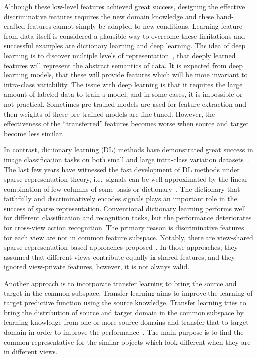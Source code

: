 Although these low-level features achieved great success, designing the effective discriminative features requires the new domain knowledge and these hand-crafted features cannot simply be adapted to new conditions. Learning feature from data itself is considered a plausible way to overcome these limitations and successful examples are dictionary learning and deep learning.
The idea of deep learning is to discover multiple levels of representation~\cite{deng2014deep}, that deeply learned features will represent the abstract semantics of data. It is expected from deep learning models, that these will provide features which will be more invariant to intra-class variability. The issue with deep learning is that it requires the large amount of labeled data to train a model, and in some cases, it is impossible or not practical. Sometimes pre-trained models are used for feature extraction and then weights of these pre-trained models are fine-tuned. However, the effectiveness of the \enquote{transferred} features becomes worse when source and target become less similar.
 
 In contrast, dictionary learning (DL) methods have demonstrated great success in image classification tasks on both small and large intra-class variation datasets~\cite{8082519}. The last few years have witnessed the fast development of DL methods under sparse representation theory, i.e., signals can be well-approximated by the linear combination of few columns of some basis or dictionary~\cite{4483511}. The dictionary that faithfully and discriminatively encodes signals plays an important role in the success of sparse representation. Conventional dictionary learning performs well for different classification and recognition tasks, but the performance deteriorates for cross-view action recognition. The primary reason is discriminative features for each view are not in common feature subspace. Notably, there are view-shared sparse representation based approaches proposed~\cite{zheng2013learning,zheng2016cross}. In those approaches, they assumed that different views contribute equally in shared features, and they ignored view-private features, however, it is not always valid.  
 
 Another approach is to incorporate transfer learning to bring the source and target in the common subspace. Transfer learning aims to improve the learning of target predictive function using the source knowledge.
Transfer learning tries to bring the distribution of source and target domain in the common subspace by learning knowledge from one or more source domains and transfer that to target domain in order to improve the performance~\cite{Weiss2016}.
The main purpose is to find the common representative for the similar objects which look different when they are in different views.

